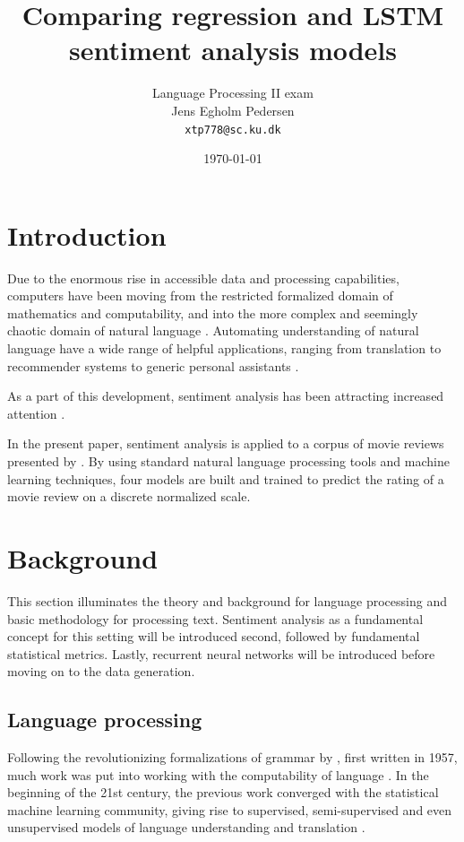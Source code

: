 \documentclass[a4paper]{article}
\title{Comparing regression and LSTM sentiment analysis models}
\author{Language Processing II exam \\ Jens Egholm Pedersen \\ \texttt{xtp778@sc.ku.dk}}
\date{\today}
\begin{document}
\maketitle

\tableofcontents

\pagebreak

\section{Introduction}
\label{sec:introduction}
Due to the enormous rise in accessible data and processing capabilities,
computers have been moving from the restricted formalized domain of
mathematics and computability, and into the more complex and seemingly
chaotic domain of natural language \citep{NILSSON2009, Jurafsky2000}. Automating
understanding of natural language have a wide range of helpful applications,
ranging from translation to recommender systems to generic personal assistants
\citep{COX2005, BKL2009}.

As a part of this development, sentiment analysis has been attracting increased
attention \citep{BKL2009, Jurafsky2000}.

In the present paper, sentiment
analysis is applied to a corpus of movie reviews presented by \cite{PangLee2005}.
By using standard natural
language processing tools and machine learning techniques, four models are built
and trained to predict the rating of a movie review on a discrete normalized scale.

\section{Background}
This section illuminates the theory and background for language processing
and basic methodology for processing text.
Sentiment analysis as a fundamental concept for this setting will be introduced
second, followed by fundamental statistical metrics. Lastly,
recurrent neural networks will be introduced before moving on to the data
generation.

\subsection{Language processing}
Following the revolutionizing formalizations of grammar by \cite{Chomsky2002},
first written in 1957, much work was put into working with the computability
of language \citep{Jurafsky2000}. In the beginning of the 21st century,
the previous work converged with the statistical machine learning community,
giving rise to supervised, semi-supervised and even unsupervised models
of language understanding and translation \citep{Jurafsky2000}.
\end{document}
